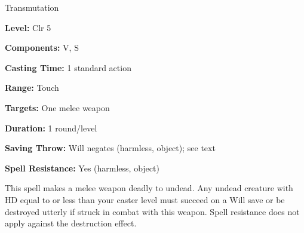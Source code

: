 
Transmutation

\textbf{Level:} Clr 5

\textbf{Components:} V, S

\textbf{Casting Time:} 1 standard action

\textbf{Range:} Touch

\textbf{Targets:} One melee weapon

\textbf{Duration:} 1 round/level

\textbf{Saving Throw:} Will negates (harmless, object); see text

\textbf{Spell Resistance:} Yes (harmless, object)

This spell makes a melee weapon deadly to undead. Any undead creature with HD equal 
to or less than your caster level must succeed on a Will save or be destroyed utterly 
if struck in combat with this weapon. Spell resistance does not apply against the 
destruction effect.

